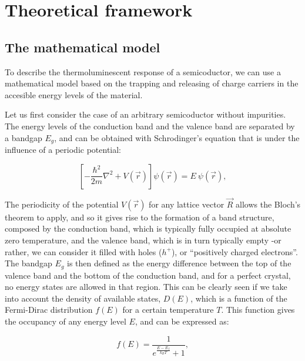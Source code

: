 \chapter{Theoretical framework}\label{ch:3}


\section{The mathematical model} \label{sec:modelo}

To describe the thermoluminescent response of a semicoductor, we can use a mathematical model based on the trapping and releasing of charge carriers in the accesible energy levels of the material. 

\vspace{10pt}

Let us first consider the case of an arbitrary semicoductor without impurities. The energy levels of the conduction band and the valence band are separated by a bandgap $E_g$, and can be obtained with Schrodinger's equation that is under the influence of a periodic potential:

\begin{equation} \label{eq:schrodinger}
  \left[ -\frac{\hbar^2}{2m} \nabla^2 + V(\vec{r}) \right] \psi(\vec{r}) = E ~ \psi(\vec{r}),
\end{equation}

\vspace{10pt}
The periodicity of the potential $V(\vec{r})$ for any lattice vector $\vec{R}$ allows the Bloch's theorem to apply, and so it gives rise to the formation of a band structure, composed by the conduction band, which is typically fully occupied at absolute zero temperature, and the valence band, which is in turn typically empty -or rather, we can consider it filled with holes ($h^+$), or ``positively charged electrons''. The bandgap $E_g$ is then defined as the energy difference between the top of the valence band and the bottom of the conduction band, and for a perfect crystal, no energy states are allowed in that region. This can be clearly seen if we take into account the density of available states, $D(E)$, which is a function of the Fermi-Dirac distribution $f(E)$ for a certain temperature $T$. This function gives the occupancy of any energy level $E$, and can be expressed as:

\begin{equation} \label{eq:fermidirac}
  f(E) = \frac{1}{e^{\frac{E - E_f}{k_B T}} + 1},
\end{equation}

